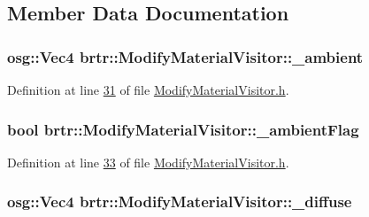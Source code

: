 \subsection{Member Data Documentation}
\hypertarget{classbrtr_1_1_modify_material_visitor_a1cffff6daf689c23a4e9680cd8f1441b}{
\subsubsection[{\+\_\+ambient}]{\setlength{\rightskip}{0pt plus 5cm}osg\+::\+Vec4 brtr\+::\+Modify\+Material\+Visitor\+::\+\_\+ambient\hspace{0.3cm}{\ttfamily [private]}}}\label{classbrtr_1_1_modify_material_visitor_a1cffff6daf689c23a4e9680cd8f1441b}


Definition at line \hyperlink{_modify_material_visitor_8h_source_l00031}{31} of file \hyperlink{_modify_material_visitor_8h_source}{Modify\+Material\+Visitor.\+h}.

\hypertarget{classbrtr_1_1_modify_material_visitor_a351e4cfeca41aa6f746956661930f994}{
\subsubsection[{\+\_\+ambient\+Flag}]{\setlength{\rightskip}{0pt plus 5cm}bool brtr\+::\+Modify\+Material\+Visitor\+::\+\_\+ambient\+Flag\hspace{0.3cm}{\ttfamily [private]}}}\label{classbrtr_1_1_modify_material_visitor_a351e4cfeca41aa6f746956661930f994}


Definition at line \hyperlink{_modify_material_visitor_8h_source_l00033}{33} of file \hyperlink{_modify_material_visitor_8h_source}{Modify\+Material\+Visitor.\+h}.

\hypertarget{classbrtr_1_1_modify_material_visitor_a33e06870644e892df2ac9af4c5bbfbd8}{
\subsubsection[{\+\_\+diffuse}]{\setlength{\rightskip}{0pt plus 5cm}osg\+::\+Vec4 brtr\+::\+Modify\+Material\+Visitor\+::\+\_\+diffuse\hspace{0.3cm}{\ttfamily [private]}}}\label{classbrtr_1_1_modify_material_visitor_a33e06870644e892df2ac9af4c5bbfbd8}


